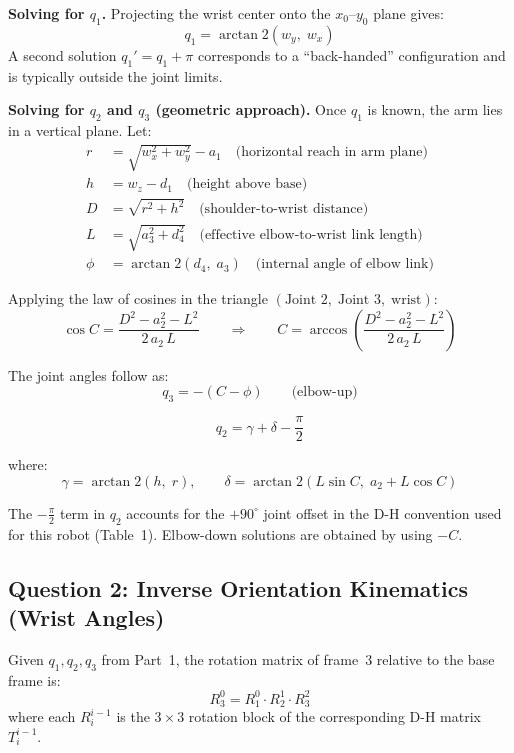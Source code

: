 \documentclass[12pt]{article}
\begin{document}
\textbf{Solving for $q_1$.}
Projecting the wrist center onto the $x_0$--$y_0$ plane gives:
\[
\boxed{q_1 = \arctan 2(w_y,\; w_x)}
\]
A second solution $q_1' = q_1 + \pi$ corresponds to a
``back-handed'' configuration and is typically outside the joint
limits.

\textbf{Solving for $q_2$ and $q_3$ (geometric approach).}
Once $q_1$ is known, the arm lies in a vertical plane.
Let:
\begin{align*}
r   &= \sqrt{w_x^2 + w_y^2} - a_1 \quad \text{(horizontal reach in arm plane)}\\
h   &= w_z - d_1                       \quad \text{(height above base)}\\
D   &= \sqrt{r^2 + h^2}                \quad \text{(shoulder-to-wrist distance)}\\
L   &= \sqrt{a_3^2 + d_4^2}            \quad \text{(effective elbow-to-wrist link length)}\\
\phi &= \arctan 2(d_4,\; a_3)          \quad \text{(internal angle of elbow link)}
\end{align*}

Applying the law of cosines in the triangle
$(\text{Joint~2},\;\text{Joint~3},\;\text{wrist})$:
\[
\cos C = \frac{D^2 - a_2^2 - L^2}{2\,a_2\,L}
\qquad \Rightarrow \qquad
C = \arccos\!\left(\frac{D^2 - a_2^2 - L^2}{2\,a_2\,L}\right)
\]

The joint angles follow as:
\[
\boxed{q_3 = -(C - \phi)}
\qquad \text{(elbow-up)}
\]

\[
\boxed{q_2 = \gamma + \delta - \frac{\pi}{2}}
\]

where:
\[
\gamma = \arctan 2(h,\; r), \qquad
\delta = \arctan 2\!\left(L\sin C,\; a_2 + L\cos C\right)
\]

The $-\tfrac{\pi}{2}$ term in $q_2$ accounts for the $+90^\circ$
joint offset in the D-H convention used for this robot (Table~1).
Elbow-down solutions are obtained by using $-C$.

\subsection{Question 2: Inverse Orientation Kinematics (Wrist Angles)}

Given $q_1, q_2, q_3$ from Part~1, the rotation matrix of
frame~3 relative to the base frame is:
\[
R_3^0 = R_1^0 \cdot R_2^1 \cdot R_3^2
\]
where each $R_i^{i-1}$ is the $3\times3$ rotation block of the
corresponding D-H matrix $T_i^{i-1}$.
\end{document}
